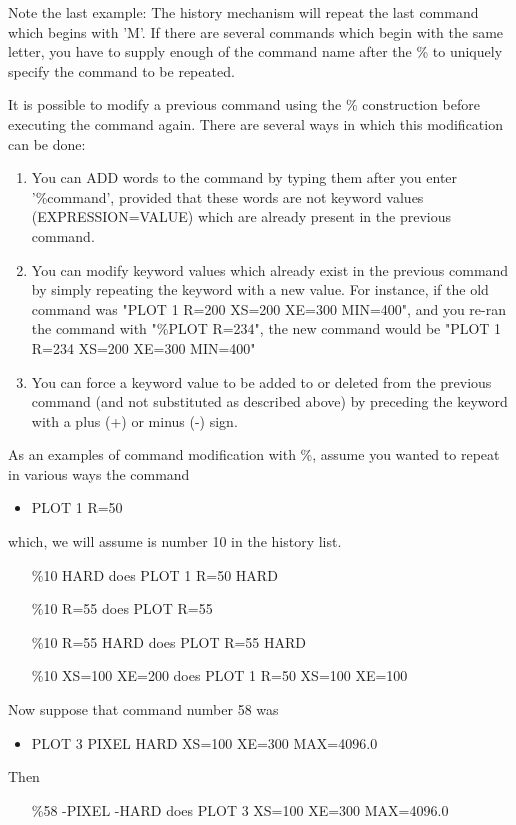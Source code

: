 Note the last example: The history mechanism will repeat the last command
which begins with 'M'.  If there are several commands which begin with the
same letter, you have to supply enough of the command name after the \% to
uniquely specify the command to be repeated.

It is possible to modify a previous command using the \% construction
before executing the command again. There are several ways in which this
modification can be done:

\begin{enumerate}
  \item{You can ADD words to the command by typing them after you enter
       '\%command', provided that these words are not keyword values
       (EXPRESSION=VALUE) which are already present in the previous
       command.}

  \item{You can modify keyword values which already exist in the previous
       command by simply repeating the keyword with a new value.  For
       instance, if the old command was "PLOT 1 R=200 XS=200 XE=300
       MIN=400", and you re-ran the command with "\%PLOT R=234", the new
       command would be "PLOT 1 R=234 XS=200 XE=300 MIN=400"}

  \item{You can force a keyword value to be added to or deleted from the
       previous command (and not substituted as described above) by
       preceding the keyword with a plus (+) or minus (-) sign.}
\end{enumerate}

As an examples of command modification with \%, assume you wanted to repeat
in various ways the command
\begin{itemize}
  \item{PLOT 1 R=50}
\end{itemize}
which, we will assume is number 10 in the history list.
\begin{itemize}
  \item[\%10 HARD\hfill]{does PLOT 1 R=50 HARD}
  \item[\%10 R=55\hfill]{does PLOT R=55}
  \item[\%10 R=55 HARD\hfill]{does PLOT R=55 HARD}
  \item[\%10 XS=100 XE=200\hfill]{does PLOT 1 R=50 XS=100 XE=100}
\end{itemize}
Now suppose that command number 58 was
\begin{itemize}
  \item{PLOT 3 PIXEL HARD XS=100 XE=300 MAX=4096.0}
\end{itemize}
Then
\begin{itemize}
  \item[\%58 -PIXEL -HARD\hfill]{does PLOT 3 XS=100 XE=300 MAX=4096.0}
\end{itemize}

